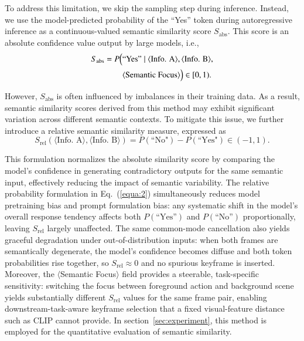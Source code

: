 \documentclass[10pt,journal]{IEEEtran}
\begin{document}
To address this limitation, we skip the sampling step during inference. Instead, we use the model-predicted probability of the “Yes” token during autoregressive inference as a continuous-valued semantic similarity score $S_\mathrm{abs}$. This score is an absolute confidence value output by large models, i.e.,
\begin{equation}
\begin{split}
S_{\mathrm{abs}} = P\Bigl(
&\text{“Yes”} \mid \langle \text{Info. A} \rangle, \langle \text{Info. B} \rangle, \\
&\langle \text{Semantic Focus} \rangle
\Bigr) \in [0,1).
\end{split}
\end{equation}

However, $S_\mathrm{abs}$ is often influenced by imbalances in their training data. As a result, semantic similarity scores derived from this method may exhibit significant variation across different semantic contexts. To mitigate this issue, we further introduce a relative semantic similarity measure, expressed as
\begin{equation}
  S_\mathrm{rel}(\langle \text{Info. A} \rangle, \langle \text{Info. B} \rangle) = P(\text{``No"}) - P(\text{``Yes"}) \in (-1,1).
  \label{equa:2}
\end{equation}

This formulation normalizes the absolute similarity score by comparing the model's confidence in generating contradictory outputs for the same semantic input, effectively reducing the impact of semantic variability. The relative probability formulation in Eq.~(\ref{equa:2}) simultaneously reduces model pretraining bias and prompt formulation bias: any systematic shift in the model's overall response tendency affects both $P(\text{``Yes''})$ and $P(\text{``No''})$ proportionally, leaving $S_\mathrm{rel}$ largely unaffected. The same common-mode cancellation also yields graceful degradation under out-of-distribution inputs: when both frames are semantically degenerate, the model's confidence becomes diffuse and both token probabilities rise together, so $S_\mathrm{rel}\!\approx\!0$ and no spurious keyframe is inserted. Moreover, the $\langle$Semantic Focus$\rangle$ field provides a steerable, task-specific sensitivity: switching the focus between foreground action and background scene yields substantially different $S_\mathrm{rel}$ values for the same frame pair, enabling downstream-task-aware keyframe selection that a fixed visual-feature distance such as CLIP cannot provide. In section~\ref{sec:experiment}, this method is employed for the quantitative evaluation of semantic similarity.
\end{document}
